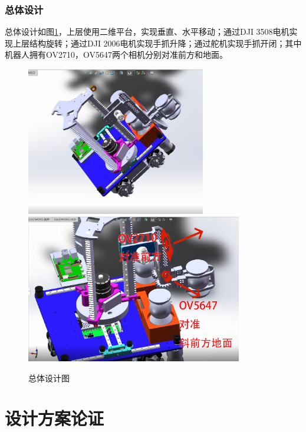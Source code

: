 \documentclass[a4paper,11pt,UTF8]{ctexart}
\begin{document}
\newpage

\subsubsection{总体设计}
总体设计如图\ref{fig_car_sw}，上层使用二维平台，实现垂直、水平移动；通过DJI 3508电机实现上层结构旋转；通过DJI 2006电机实现手抓升降；通过舵机实现手抓开闭；其中机器人拥有OV2710，OV5647两个相机分别对准前方和地面。
\begin{figure}[htbp]
  \centering
  \includegraphics[height=6.5cm]{car_sw.jpg}
  \includegraphics[height=6.5cm]{car_cam.jpg}
  \caption{总体设计图} \label{fig_car_sw}
\end{figure}



\section{设计方案论证}
\end{document}
